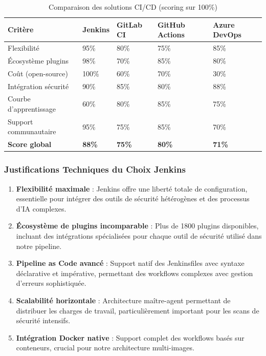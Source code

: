 \documentclass[12pt,a4paper]{report}
\begin{document}
\begin{table}[H]
    \centering
    \begin{tabularx}{\textwidth}{|X|X|X|X|X|}
        \hline
        \textbf{Critère} & \textbf{Jenkins} & \textbf{GitLab CI} & \textbf{GitHub Actions} & \textbf{Azure DevOps} \\
        \hline
        Flexibilité & 95\% & 80\% & 75\% & 85\% \\
        \hline
        Écosystème plugins & 98\% & 70\% & 85\% & 80\% \\
        \hline
        Coût (open-source) & 100\% & 60\% & 70\% & 30\% \\
        \hline
        Intégration sécurité & 90\% & 85\% & 80\% & 88\% \\
        \hline
        Courbe d'apprentissage & 60\% & 80\% & 85\% & 75\% \\
        \hline
        Support communautaire & 95\% & 75\% & 85\% & 70\% \\
        \hline
        \textbf{Score global} & \textbf{88\%} & \textbf{75\%} & \textbf{80\%} & \textbf{71\%} \\
        \hline
    \end{tabularx}
    \caption{Comparaison des solutions CI/CD (scoring sur 100\%)}
\end{table}

\subsubsection{Justifications Techniques du Choix Jenkins}

\begin{enumerate}
    \item \textbf{Flexibilité maximale} : Jenkins offre une liberté totale de configuration, essentielle pour intégrer des outils de sécurité hétérogènes et des processus d'IA complexes.

    \item \textbf{Écosystème de plugins incomparable} : Plus de 1800 plugins disponibles, incluant des intégrations spécialisées pour chaque outil de sécurité utilisé dans notre pipeline.

    \item \textbf{Pipeline as Code avancé} : Support natif des Jenkinsfiles avec syntaxe déclarative et impérative, permettant des workflows complexes avec gestion d'erreurs sophistiquée.

    \item \textbf{Scalabilité horizontale} : Architecture maître-agent permettant de distribuer les charges de travail, particulièrement important pour les scans de sécurité intensifs.

    \item \textbf{Intégration Docker native} : Support complet des workflows basés sur conteneurs, crucial pour notre architecture multi-images.
\end{enumerate}
\end{document}

